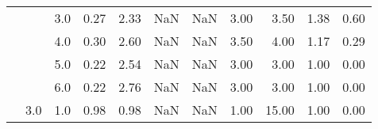 \begin{tabular}{lllrrrrrrrr}
       &     & 3.0  &      0.27 &       2.33 &               NaN &                NaN & 3.00 &   3.50 &             1.38 &                         0.60 \\
       &     & 4.0  &      0.30 &       2.60 &               NaN &                NaN & 3.50 &   4.00 &             1.17 &                         0.29 \\
       &     & 5.0  &      0.22 &       2.54 &               NaN &                NaN & 3.00 &   3.00 &             1.00 &                         0.00 \\
       &     & 6.0  &      0.22 &       2.76 &               NaN &                NaN & 3.00 &   3.00 &             1.00 &                         0.00 \\
       & 3.0 & 1.0  &      0.98 &       0.98 &               NaN &                NaN & 1.00 &  15.00 &             1.00 &                         0.00 \\
\bottomrule
\end{tabular}
